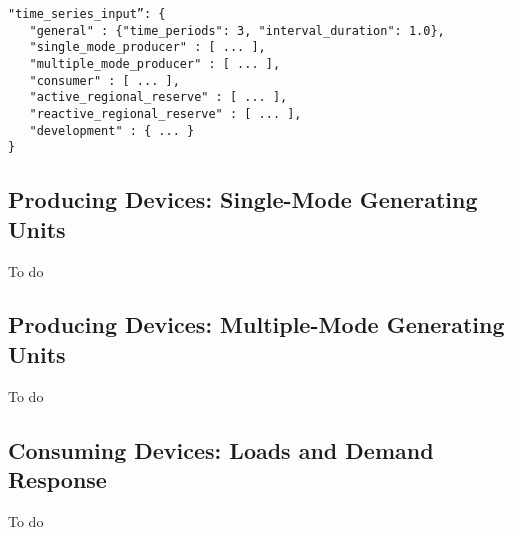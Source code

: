 \begin{verbatim}
"time_series_input”: {
   "general" : {"time_periods": 3, "interval_duration": 1.0},   
   "single_mode_producer" : [ ... ],
   "multiple_mode_producer" : [ ... ],
   "consumer" : [ ... ],
   "active_regional_reserve" : [ ... ],
   "reactive_regional_reserve" : [ ... ],
   "development" : { ... }
}    
\end{verbatim}


\subsection{Producing Devices: Single-Mode Generating Units}
\label{sec:generator_time}
\begin{todo}[]{}
To do
\end{todo}
\subsection{Producing Devices: Multiple-Mode Generating Units}
\label{sec:multi-generator_time}
\begin{todo}[]{}
To do
\end{todo}
\subsection{Consuming Devices: Loads and Demand Response}
\label{sec:load_time}
\begin{todo}[]{}
To do
\end{todo}




